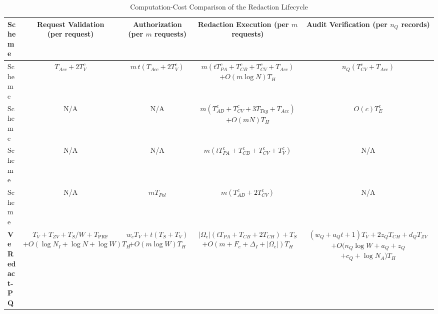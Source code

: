 \documentclass[lettersize,journal]{IEEEtran}
\begin{document}
\begin{table}[t]
\centering
\caption{Computation-Cost Comparison of the Redaction Lifecycle}
\label{tab:comp-cost}
\footnotesize
\renewcommand{\arraystretch}{1.25}
\renewcommand{\cellset}{\renewcommand{\arraystretch}{1.45}}
\setlength{\tabcolsep}{3.2pt}
\begin{adjustbox}{max width=\textwidth}
\begin{tabular}{lcccc}
\toprule
\textbf{Scheme} &
\makecell{\textbf{Request Validation}\\\textbf{(per request)}} &
\makecell{\textbf{Authorization}\\\textbf{(per $m$ requests)}} &
\makecell{\textbf{Redaction Execution}\\\textbf{(per $m$ requests)}} &
\makecell{\textbf{Audit Verification}\\\textbf{(per $n_Q$ records)}} \\
\midrule

Scheme~\cite{ref1}
& $T_{Acc}+2T_V^{c}$
& $m\,t(T_{Acc}+2T_V^{c})$
& \makecell{$m(tT_{PA}^{c}+T_{CB}^{c}+T_{CV}^{c}+T_{Acc})$\\
$+O(m\log N)T_H$}
& $n_Q(T_{CV}^{c}+T_{Acc})$ \\

Scheme~\cite{ref13}
& N/A
& N/A
& \makecell{$m(T_{AD}^{c}+T_{CV}^{c}+3T_{Tag}+T_{Acc})$\\
$+O(mN)T_H$}
& $O(c)T_E^{c}$ \\

Scheme~\cite{ref27}
& N/A
& N/A
& $m(tT_{PA}^{c}+T_{CB}^{c}+T_{CV}^{c}+T_V^{c})$
& N/A \\

Scheme~\cite{ref34}
& N/A
& $mT_{Pol}$
& $m(T_{AD}^{c}+2T_{CV}^{c})$
& N/A \\

\midrule
\textbf{VeRedact-PQ}
& \makecell{$T_V+T_{ZV}+T_S/W+T_{\mathrm{PRF}}$\\
$+O(\log N_I+\log N+\log W)T_H$}
& \makecell{$w_eT_V+t(T_S+T_V)$\\
$+O(m\log W)T_H$}
& \makecell{$|\Omega_e|(tT_{PA}+T_{CB}+2T_{CH})+T_S$\\
$+O(m+F_e+\Delta_I+|\Omega_e|)T_H$}
& \makecell{$(w_Q+a_Qt+1)T_V+2z_QT_{CH}+d_QT_{ZV}$\\
$+O(n_Q\log W+a_Q+z_Q$\\
$+c_Q+\log N_A)T_H$} \\


\end{tabular}
\end{adjustbox}
\end{table}
\end{document}
